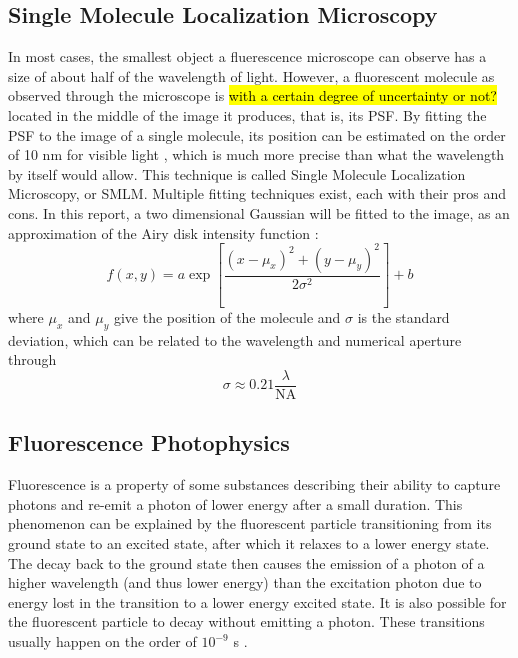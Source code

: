 \subsection{Single Molecule Localization Microscopy}
In most cases, the smallest object a fluerescence microscope can observe has a size of about half of the wavelength of light. However, a fluorescent molecule as observed through the microscope is \hl{with a certain degree of uncertainty or not?} located in the middle of the image it produces, that is, its PSF. By fitting the PSF to the image of a single molecule, its position can be estimated on the order of 10 nm for visible light \cite{douglass_notice_2023}, which is much more precise than what the wavelength by itself would allow. This technique is called Single Molecule Localization Microscopy, or SMLM. Multiple fitting techniques exist, each with their pros and cons. In this report, a two dimensional Gaussian will be fitted to the image, as an approximation of the Airy disk intensity function \cite{douglass_notice_2023}:
\begin{equation}
    f(x, y) = a \exp \left[ \frac{(x-\mu_x)^2 + (y-\mu_y)^2}{2 \sigma^2} \right] + b
\end{equation}
where $\mu_x$ and $\mu_y$ give the position of the molecule and $\sigma$ is the standard deviation, which can be related to the wavelength and numerical aperture through \cite{zhang-appliedoptics-2007}
\begin{equation}
    \sigma \approx 0.21 \frac{\lambda}{\textrm{NA}}
    \label{eq:PSF_width_gaussian}
\end{equation}

\subsection{Fluorescence Photophysics}
Fluorescence is a property of some substances describing their ability to capture photons and re-emit a photon of lower energy after a small duration. This phenomenon can be explained by the fluorescent particle transitioning from its ground state to an excited state, after which it relaxes to a lower energy state. The decay back to the ground state then causes the emission of a photon of a higher wavelength (and thus lower energy) than the excitation photon due to energy lost in the transition to a lower energy excited state. It is also possible for the fluorescent particle to decay without emitting a photon. These transitions usually happen on the order of $10^{-9}$ s \cite{douglass_notice_2023}.

